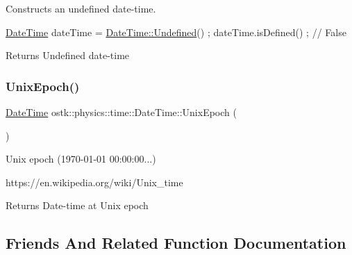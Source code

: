 Constructs an undefined date-\/time. 


\begin{DoxyCode}
\hyperlink{classostk_1_1physics_1_1time_1_1_date_time_a974b5a7581ae7461ccf0e6ab85e42633}{DateTime} dateTime = \hyperlink{classostk_1_1physics_1_1time_1_1_date_time_a9ca19b137678a1c4a97df8c96a1f3f80}{DateTime::Undefined}() ;
dateTime.isDefined() ; \textcolor{comment}{// False}
\end{DoxyCode}


\begin{DoxyReturn}{Returns}
Undefined date-\/time 
\end{DoxyReturn}
\mbox{\label{classostk_1_1physics_1_1time_1_1_date_time_a3f3b2cb5f50eb5fe0df9840c2563f8f7}} 
\subsubsection{\texorpdfstring{Unix\+Epoch()}{UnixEpoch()}}
{\footnotesize\ttfamily \hyperlink{classostk_1_1physics_1_1time_1_1_date_time}{Date\+Time} ostk\+::physics\+::time\+::\+Date\+Time\+::\+Unix\+Epoch (\begin{DoxyParamCaption}{ }\end{DoxyParamCaption})\hspace{0.3cm}{\ttfamily [static]}}



Unix epoch (1970-\/01-\/01 00\+:00\+:00...) 

https\+://en.wikipedia.\+org/wiki/\+Unix\+\_\+time

\begin{DoxyReturn}{Returns}
Date-\/time at Unix epoch 
\end{DoxyReturn}


\subsection{Friends And Related Function Documentation}
\mbox{\label{classostk_1_1physics_1_1time_1_1_date_time_afd7a10118810d4133db2044ddbb7e001}} 
